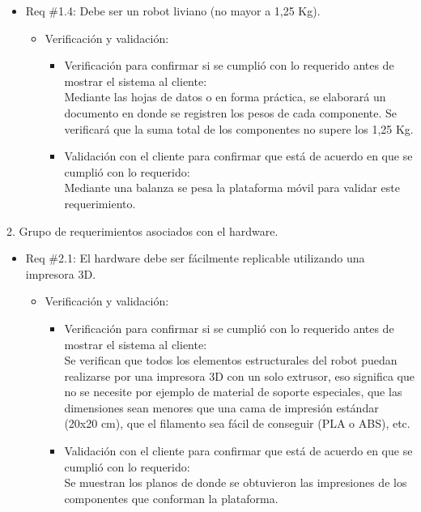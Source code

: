 \documentclass[11pt]{charter}
\begin{document}
\begin{itemize}
\item Req \#1.4: Debe ser un robot liviano (no mayor a 1,25 Kg).
\begin{itemize} 
\item Verificación y validación:
	\begin{itemize}
	\item Verificación para confirmar si se cumplió con lo requerido 	antes de mostrar el sistema al cliente:\\
	Mediante las hojas de datos o en forma práctica, se elaborará un
	documento en donde se registren los pesos de cada componente. Se
	verificará que la suma total de los componentes no supere los
	1,25 Kg.
	\item Validación con el cliente para confirmar que está de 				acuerdo en que se cumplió con lo requerido:\\
	Mediante una balanza se pesa la plataforma móvil para validar
	este requerimiento.  
	\end{itemize}
\end{itemize}
\end{itemize}

2. Grupo de requerimientos asociados con el hardware.

\begin{itemize}
\item Req \#2.1: El hardware debe ser fácilmente replicable utilizando una impresora 3D.
\begin{itemize}
\item Verificación y validación:
	\begin{itemize}
	\item Verificación para confirmar si se cumplió con lo requerido 	antes de mostrar el sistema al cliente:\\
	Se verifican que todos los elementos estructurales del
 	robot puedan realizarse por una impresora 3D con un solo 
 	extrusor, eso significa que no se necesite por ejemplo de
 	material de soporte	especiales, que las dimensiones sean
 	menores que una cama de impresión estándar (20x20 cm), 
 	que el filamento sea fácil de conseguir (PLA o ABS), etc.
	\item Validación con el cliente para confirmar que está de 				acuerdo en que se cumplió con lo requerido:\\
	Se muestran los planos de donde se obtuvieron las impresiones de 
	los componentes  que conforman la plataforma.    
	\end{itemize}
\end{itemize}
\end{itemize}
\end{document}
